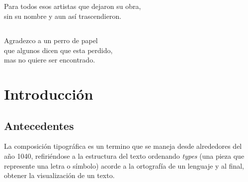 \documentclass[12pt,letterpaper,titlepage,oneside,openright]{book}
\begin{document}
\newpage
 
\section*{} %
\begin{flushright}
Para todos esos artistas que dejaron su obra, \\ sin su nombre y aun así trascendieron.
\end{flushright}

\newpage

\section*{} %
\begin{flushleft}
Agradezco a un perro de papel \\
que algunos dicen que esta perdido, \\
mas no quiere ser encontrado.
\end{flushleft}

\newpage

\tableofcontents

\mainmatter



 
 


\chapter{Introducción}
\section{Antecedentes}
La composición tipográfica es un termino que se maneja desde alrededores del año 1040, refiriéndose
a la estructura del texto ordenando \textit{types} (una pieza que represente una letra o
símbolo) acorde a la ortografía de un lenguaje y al final, obtener la visualización de un texto.
\end{document}
